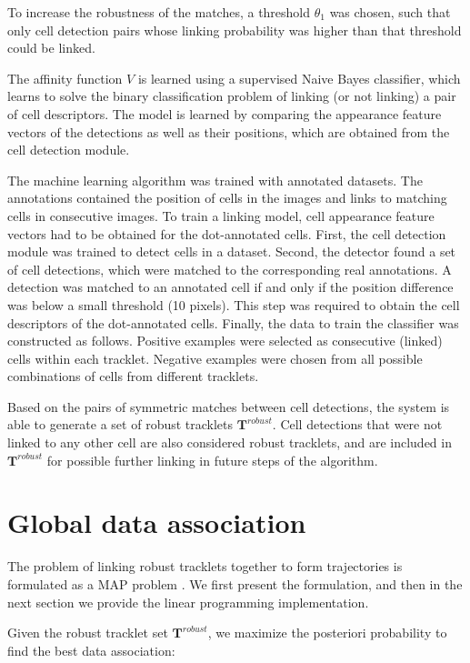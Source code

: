 		To increase the robustness of the matches, a threshold $\theta_1$ was chosen, such that only cell detection pairs whose linking probability was higher than that threshold could be linked.
		
		The affinity function $V$ is learned using a supervised Naive Bayes classifier, which learns to solve the binary classification problem of linking (or not linking) a pair of cell descriptors. The model is learned by comparing the appearance feature vectors of the detections as well as their positions, which are obtained from the cell detection module.
		
		The machine learning algorithm was trained with annotated datasets. The annotations contained the position of cells in the images and links to matching cells in consecutive images. To train a linking model, cell appearance feature vectors had to be obtained for the dot-annotated cells. First, the cell detection module was trained to detect cells in a dataset. Second, the detector found a set of cell detections, which were matched to the corresponding real annotations. A detection was matched to an annotated cell if and only if the position difference was below a small threshold (10 pixels). This step was required to obtain the cell descriptors of the dot-annotated cells. Finally, the data to train the classifier was constructed as follows. Positive examples were selected as consecutive (linked) cells within each tracklet. Negative examples were chosen from all possible combinations of cells from different tracklets.

		Based on the pairs of symmetric matches between cell detections, the system is able to generate a set of robust tracklets $\textbf{T}^{robust}$. Cell detections that were not linked to any other cell are also considered robust tracklets, and are included in $\textbf{T}^{robust}$ for possible further linking in future steps of the algorithm.
		
	\section{Global data association}
		\label{sec:globaldataassoc}
		The problem of linking robust tracklets together to form trajectories is formulated as a MAP problem \cite{bise11global,zhang08,huang08}. We first present the formulation, and then in the next section we provide the linear programming implementation.
		
		Given the robust tracklet set $ \textbf{T}^{robust} $, we maximize the posteriori probability to find the best data association:
		

